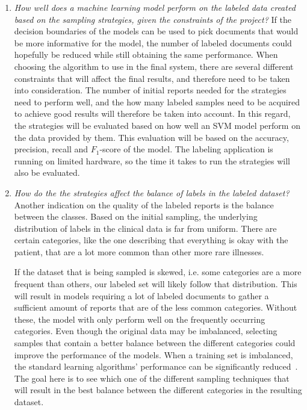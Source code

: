 \begin{enumerate}
      \item \label{intro:re-q1} 
      \textit{How well does a machine learning model perform on the labeled data created based on the sampling strategies, given the constraints of the project?}
      \newline
      If the decision boundaries of the models can be used to pick documents that would be more informative for the model, the number of labeled documents could hopefully be reduced while still obtaining the same performance.
      When choosing the algorithm to use in the final system, there are several different constraints that will affect the final results, and therefore need to be taken into consideration.
      The number of initial reports needed for the strategies need to perform well, and the how many labeled samples need to be acquired to achieve good results will therefore be taken into account.
      In this regard, the strategies will be evaluated based on how well an SVM model perform on the data provided by them.
      This evaluation will be based on the accuracy, precision, recall and $F_1$-score of the model.
      The labeling application is running on limited hardware, so the time it takes to run the strategies will also be evaluated.

      \item \label{intro:re-q2}
      \textit{How do the the strategies affect the balance of labels in the labeled dataset?}
      Another indication on the quality of the labeled reports is the balance between the classes.
      Based on the initial sampling, the underlying distribution of labels in the clinical data is far from uniform.
      There are certain categories, like the one describing that everything is okay with the patient, that are a lot more common than other more rare illnesses.

      If the dataset that is being sampled is skewed, i.e. some categories are a more frequent than others, our labeled set will likely follow that distribution.
      This will result in models requiring a lot of labeled documents to gather a sufficient amount of reports that are of the less common categories.
      Without these, the model with only perform well on the frequently occurring categories.
      Even though the original data may be imbalanced, selecting samples that contain a better balance between the different categories could improve the performance of the models.
      When a training set is imbalanced, the standard learning algorithms' performance can be significantly reduced~\cite{he2009learning}.
      The goal here is to see which one of the different sampling techniques that will result in the best balance between the different categories in the resulting dataset.

\end{enumerate}

